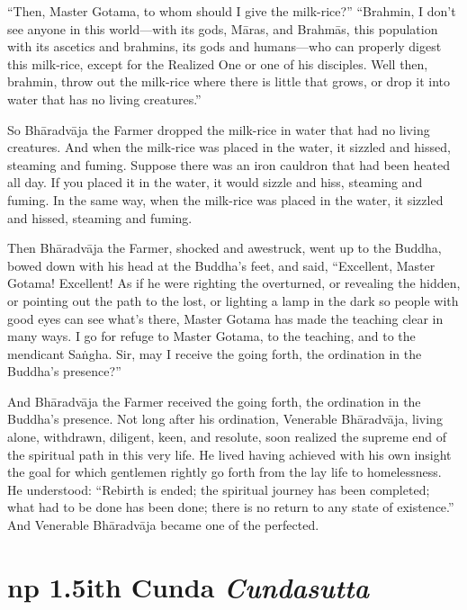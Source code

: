 \documentclass[12pt,openany]{book}%
\newcommand*{\suttatitleacronym}[1]{\smaller[2]{#1}\vspace*{.3em}}
\newcommand*{\suttatitletranslation}[1]{\linebreak{#1}}
\newcommand*{\suttatitleroot}[1]{\linebreak\smaller[2]\itshape{#1}}
\newcommand*{\tocacronym}[1]{\hspace*{-3.3em}{#1}\quad}
\newcommand*{\toctranslation}[1]{#1}
\newcommand*{\tocroot}[1]{(\textit{#1})}
\begin{document}
“Then, Master Gotama, to whom should I give the milk-rice?” “Brahmin, I don’t see anyone in this world—with its gods, \textsanskrit{Māras}, and \textsanskrit{Brahmās}, this population with its ascetics and brahmins, its gods and humans—who can properly digest this milk-rice, except for the Realized One or one of his disciples. Well then, brahmin, throw out the milk-rice where there is little that grows, or drop it into water that has no living creatures.” 

So \textsanskrit{Bhāradvāja} the Farmer dropped the milk-rice in water that had no living creatures. And when the milk-rice was placed in the water, it sizzled and hissed, steaming and fuming. Suppose there was an iron cauldron that had been heated all day. If you placed it in the water, it would sizzle and hiss, steaming and fuming. In the same way, when the milk-rice was placed in the water, it sizzled and hissed, steaming and fuming. 

Then \textsanskrit{Bhāradvāja} the Farmer, shocked and awestruck,  went up to the Buddha, bowed down with his head at the Buddha’s feet, and said, “Excellent, Master Gotama! Excellent! As if he were righting the overturned, or revealing the hidden, or pointing out the path to the lost, or lighting a lamp in the dark so people with good eyes can see what’s there, Master Gotama has made the teaching clear in many ways. I go for refuge to Master Gotama, to the teaching, and to the mendicant \textsanskrit{Saṅgha}. Sir, may I receive the going forth, the ordination in the Buddha’s presence?” 

And \textsanskrit{Bhāradvāja} the Farmer received the going forth, the ordination in the Buddha’s presence. Not long after his ordination, Venerable \textsanskrit{Bhāradvāja}, living alone, withdrawn, diligent, keen, and resolute, soon realized the supreme end of the spiritual path in this very life. He lived having achieved with his own insight the goal for which gentlemen rightly go forth from the lay life to homelessness. He understood: “Rebirth is ended; the spiritual journey has been completed; what had to be done has been done; there is no return to any state of existence.” And Venerable \textsanskrit{Bhāradvāja} became one of the perfected. 

%
\section*{{\suttatitleacronym Snp 1.5}{\suttatitletranslation With Cunda }{\suttatitleroot Cundasutta}}
\addcontentsline{toc}{section}{\tocacronym{Snp 1.5} \toctranslation{With Cunda } \tocroot{Cundasutta}}
\end{document}

